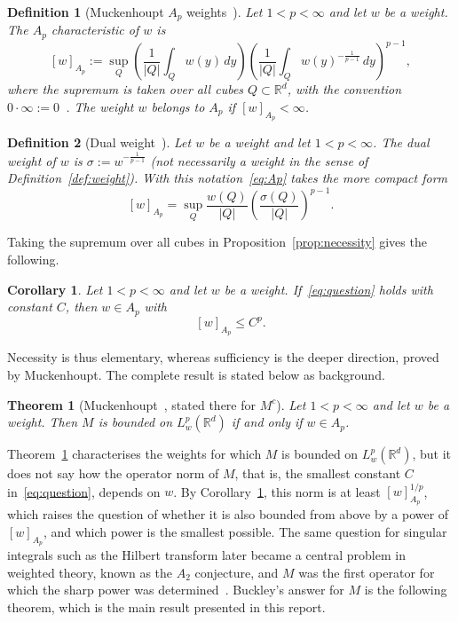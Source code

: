 \documentclass[12pt]{article}
\newtheorem{theorem}{Theorem}
\newtheorem{corollary}{Corollary}
\newtheorem{definition}{Definition}
\begin{document}
\begin{definition}[{Muckenhoupt $A_p$ weights~\cite[(7.10)]{Muckenhoupt1972}}]\label{def:Ap}
Let $1 < p < \infty$ and let $w$ be a weight. The \emph{$A_p$ characteristic} of $w$ is
\begin{equation}\label{eq:Ap}
  [w]_{A_p} := \sup_{Q} \left( \frac{1}{|Q|} \int_Q w(y)\,dy \right) \left( \frac{1}{|Q|} \int_Q w(y)^{-\frac{1}{p-1}}\,dy \right)^{p-1},
\end{equation}
where the supremum is taken over all cubes $Q \subset \mathbb{R}^d$, with the convention $0 \cdot \infty := 0$~\cite[Section~1]{Muckenhoupt1972}. The weight $w$ belongs to $A_p$ if $[w]_{A_p} < \infty$.
\end{definition}

\begin{definition}[{Dual weight~\cite[Section~1]{Buckley1993}}]\label{def:dual}
Let $w$ be a weight and let $1 < p < \infty$. The \emph{dual weight} of $w$ is $\sigma := w^{-\frac{1}{p-1}}$ (not necessarily a weight in the sense of Definition~\ref{def:weight}). With this notation~\eqref{eq:Ap} takes the more compact form
\[
  [w]_{A_p} = \sup_Q \frac{w(Q)}{|Q|} \left( \frac{\sigma(Q)}{|Q|} \right)^{p-1}.
\]
\end{definition}

Taking the supremum over all cubes in Proposition~\ref{prop:necessity} gives the following.

\begin{corollary}\label{cor:necessity}
Let $1 < p < \infty$ and let $w$ be a weight. If~\eqref{eq:question} holds with constant $C$, then $w \in A_p$ with
\[
  [w]_{A_p} \le C^p .
\]
\end{corollary}

Necessity is thus elementary, whereas sufficiency is the deeper direction, proved by Muckenhoupt. The complete result is stated below as background.

\begin{theorem}[{Muckenhoupt~\cite[Theorem~9]{Muckenhoupt1972}, stated there for $M^c$}]\label{thm:muckenhoupt}
Let $1 < p < \infty$ and let $w$ be a weight. Then $M$ is bounded on $L^p_w(\mathbb{R}^d)$ if and only if $w \in A_p$.
\end{theorem}

Theorem~\ref{thm:muckenhoupt} characterises the weights for which $M$ is bounded on $L^p_w(\mathbb{R}^d)$, but it does not say how the operator norm of $M$, that is, the smallest constant $C$ in~\eqref{eq:question}, depends on $w$. By Corollary~\ref{cor:necessity}, this norm is at least $[w]_{A_p}^{1/p}$, which raises the question of whether it is also bounded from above by a power of $[w]_{A_p}$, and which power is the smallest possible. The same question for singular integrals such as the Hilbert transform later became a central problem in weighted theory, known as the $A_2$ conjecture, and $M$ was the first operator for which the sharp power was determined~\cite[Section~2.5]{Pereyra2019}. Buckley's answer for $M$ is the following theorem, which is the main result presented in this report.
\end{document}
